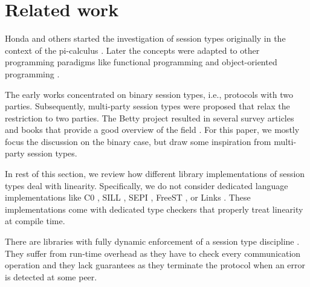 \documentclass[acmsmall,review,anonymous,screen]{acmart}
\begin{document}
\section{Related work}
\label{sec:related-work}

Honda and others
\cite{DBLP:conf/concur/Honda93,DBLP:conf/parle/TakeuchiHK94,DBLP:conf/esop/HondaVK98}
started the investigation of session types originally in the context
of the pi-calculus \cite{DBLP:journals/iandc/MilnerPW92a}. Later the concepts were adapted to other programming
paradigms like functional programming
\cite{DBLP:journals/tcs/VasconcelosGR06,DBLP:journals/jfp/GayV10} and
object-oriented programming
\cite{DBLP:conf/europar/RavaraV97,DBLP:journals/corr/abs-1205-5344}. 

The early works concentrated on binary session types, i.e., protocols
with two parties. Subsequently, multi-party session types were
proposed \cite{DBLP:journals/jacm/HondaYC16} that relax the
restriction to two parties. The Betty project resulted in several survey articles
and books that provide a good overview of the field
\cite{gay17:_behav_types,DBLP:journals/csur/HuttelLVCCDMPRT16,DBLP:journals/jlp/BartolettiCDDGP15,DBLP:journals/ftpl/AnconaBB0CDGGGH16}. 
For this paper, we mostly focus the discussion on the binary case, but draw some
inspiration from multi-party session types.



In rest of this section, we review how different library implementations of
session types deal with linearity. Specifically, we do not consider
dedicated language implementations like
C0 \cite{DBLP:journals/corr/WillseyPP17},
SILL \cite{DBLP:conf/esop/ToninhoCP13},
SEPI \cite{DBLP:conf/sefm/FrancoV13},
FreeST \cite{DBLP:journals/iandc/AlmeidaMTV22},
or Links \cite{lindley17:_light_funct_session_types}. These
implementations come with dedicated type checkers that properly treat
linearity at compile time.





There are libraries with fully dynamic enforcement of a session type
discipline
\cite{DBLP:conf/rv/HuNYDH13,DBLP:journals/pacmpl/MelgrattiP17}. They
suffer from run-time overhead as they have to check every
communication operation and they lack guarantees as they terminate the
protocol when an error is detected at some peer. 
\end{document}
